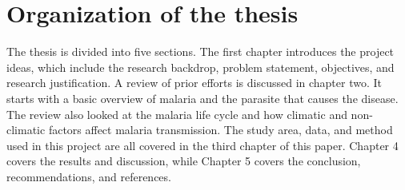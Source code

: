 \section{Organization of the thesis}
The thesis is divided into five sections. The first chapter introduces the project ideas, which include the research backdrop, problem statement, objectives, and research justification. A review of prior efforts is discussed in chapter two. It starts with a basic overview of malaria and the parasite that causes the disease. The review also looked at the malaria life cycle and how climatic and non-climatic factors affect malaria transmission. The study area, data, and method used in this project are all covered in the third chapter of this paper. Chapter 4 covers the results and discussion, while Chapter 5 covers the conclusion, recommendations, and references.